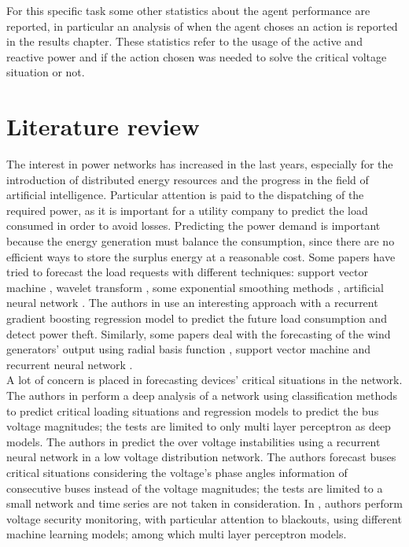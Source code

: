 For this specific task some other statistics about the agent performance are reported, in particular 
an analysis of when the agent choses an action is reported in the results chapter. These statistics refer to the usage of the active and reactive power and if the action chosen was needed to solve the critical voltage situation or not.

\section{Literature review}
\label{sec:lr}
The interest in power networks has increased in the last years, especially for the introduction of distributed energy resources and the progress in the field of artificial intelligence. Particular attention is paid to the dispatching of the required power, as it is important for a utility company to predict the load consumed in order to avoid losses. Predicting the power demand is important because the energy generation must balance the consumption, since there are no efficient ways to store the surplus energy at a reasonable cost. Some papers have tried to forecast the load requests with different techniques: support vector machine \cite{lr_svmload}, wavelet transform \cite{lr_wavt}, some exponential smoothing methods \cite{lr_expsmo}, artificial neural network \cite{lr_annload}. The authors in \cite{lr_rnnload} use an interesting approach with a recurrent gradient boosting regression model to predict the future load consumption and detect power theft. Similarly, some papers deal with the forecasting of the wind generators' output using radial basis function \cite{lr_rbfgen}, support vector machine \cite{lr_svmgen} and recurrent neural network \cite{lr_rnngen}.\\
A lot of concern is placed in forecasting devices' critical situations in the network. The authors in \cite{lr_godm} perform a deep analysis of a network using classification methods to predict critical loading situations and regression models to predict the bus voltage magnitudes; the tests are limited to only multi layer perceptron as deep models. The authors in \cite{lr_frnn} predict the over voltage instabilities using a recurrent neural network in a low voltage distribution network. The authors forecast buses critical situations considering the voltage's phase angles information of consecutive buses instead of the voltage magnitudes; the tests are limited to a small network and time series are not taken in consideration. In \cite{lr_fblack}, authors perform voltage security monitoring, with particular attention to blackouts, using different machine learning models; among which multi layer perceptron models.\\
